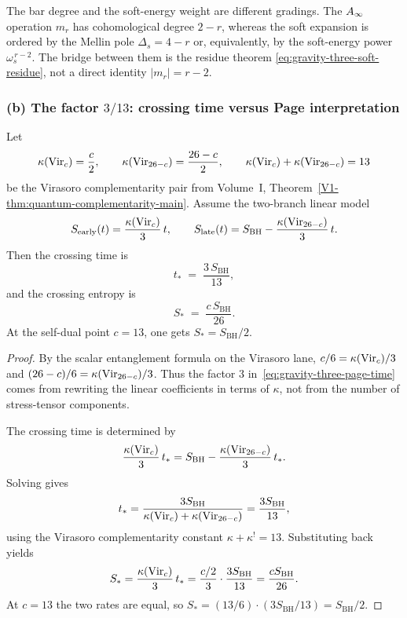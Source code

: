 \begin{remark}[On degrees]
\label{rem:gravity-three-soft-degrees}
The bar degree and the soft-energy weight are different gradings.
The $A_\infty$ operation $m_r$ has cohomological degree $2-r$, whereas the
soft expansion is ordered by the Mellin pole $\Delta_s = 4-r$ or,
equivalently, by the soft-energy power $\omega_s^{\,r-2}$. The bridge
between them is the residue theorem
\eqref{eq:gravity-three-soft-residue}, not a direct identity
$|m_r| = r-2$.
\end{remark}

\subsubsection*{(b) The factor $3/13$: crossing time versus Page interpretation}

\begin{proposition}
\label{prop:gravity-three-page}
Let
\[
\kappa(\mathrm{Vir}_c)=\frac{c}{2},
\qquad
\kappa(\mathrm{Vir}_{26-c})=\frac{26-c}{2},
\qquad
\kappa(\mathrm{Vir}_c)+\kappa(\mathrm{Vir}_{26-c})=13
\]
be the Virasoro complementarity pair from
Volume~I, Theorem~\ref{V1-thm:quantum-complementarity-main}. Assume the
two-branch linear model
\begin{equation}\label{eq:gravity-three-page-model}
S_{\mathrm{early}}(t)=\frac{\kappa(\mathrm{Vir}_c)}{3}\,t,
\qquad
S_{\mathrm{late}}(t)=S_{\mathrm{BH}}
-\frac{\kappa(\mathrm{Vir}_{26-c})}{3}\,t.
\end{equation}
Then the crossing time is
\begin{equation}\label{eq:gravity-three-page-time}
t_* \;=\; \frac{3\,S_{\mathrm{BH}}}{13},
\end{equation}
and the crossing entropy is
\begin{equation}\label{eq:gravity-three-page-entropy}
S_* \;=\; \frac{c\,S_{\mathrm{BH}}}{26}.
\end{equation}
At the self-dual point $c=13$, one gets
$S_* = S_{\mathrm{BH}}/2$.
\end{proposition}

\begin{proof}
By the scalar entanglement formula on the Virasoro lane,
$c/6 = \kappa(\mathrm{Vir}_c)/3$ and $(26-c)/6 = \kappa(\mathrm{Vir}_{26-c})/3$.
Thus the factor $3$ in~\eqref{eq:gravity-three-page-time} comes from
rewriting the linear coefficients in terms of $\kappa$, not from the
number of stress-tensor components.

The crossing time is determined by
\[
\frac{\kappa(\mathrm{Vir}_c)}{3}\,t_*
=
S_{\mathrm{BH}}
-\frac{\kappa(\mathrm{Vir}_{26-c})}{3}\,t_*.
\]
Solving gives
\[
t_*
=
\frac{3S_{\mathrm{BH}}}
{\kappa(\mathrm{Vir}_c)+\kappa(\mathrm{Vir}_{26-c})}
=
\frac{3S_{\mathrm{BH}}}{13},
\]
using the Virasoro complementarity constant
$\kappa+\kappa^!=13$.
Substituting back yields
\[
S_*
=
\frac{\kappa(\mathrm{Vir}_c)}{3}\,t_*
=
\frac{c/2}{3}\cdot\frac{3S_{\mathrm{BH}}}{13}
=
\frac{cS_{\mathrm{BH}}}{26}.
\]
At $c=13$ the two rates are equal, so
$S_* = (13/6)\cdot(3S_{\mathrm{BH}}/13)=S_{\mathrm{BH}}/2$.
\end{proof}

